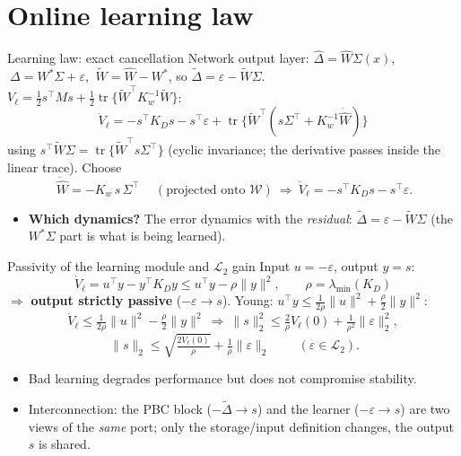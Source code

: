 \documentclass[aspectratio=169,10pt]{beamer}
\newcommand{\tr}{\operatorname{tr}}
\newcommand{\lmin}{\lambda_{\min}}
\begin{document}
\section{Online learning law}
\begin{frame}{Learning law: exact cancellation}
Network output layer: $\hat\Delta=\hat W\Sigma(x)$, $\ \Delta=W^*\Sigma+\varepsilon$, $\ \tilde W=\hat W-W^*$, so $\tilde\Delta=\varepsilon-\tilde W\Sigma$.\\[1mm]
$V_\ell=\tfrac12s^\top Ms+\tfrac12\tr\{\tilde W^\top K_w^{-1}\tilde W\}$:
\[
\dot V_\ell=-s^\top K_Ds-s^\top\varepsilon+\tr\{\tilde W^\top(s\Sigma^\top+K_w^{-1}\dot{\hat W})\}
\]
using $s^\top\tilde W\Sigma=\tr\{\tilde W^\top s\Sigma^\top\}$ (cyclic invariance; the derivative passes inside the linear trace). Choose
\[
\boxed{\ \dot{\hat W}=-K_w\,s\,\Sigma^\top\ }\quad(\text{projected onto }\mathcal W)\ \Rightarrow\ \dot V_\ell=-s^\top K_Ds-s^\top\varepsilon .
\]
\begin{itemize}
\item \textbf{Which dynamics?} The error dynamics with the \emph{residual}: $\tilde\Delta=\varepsilon-\tilde W\Sigma$ (the $W^*\Sigma$ part is what is being learned).
\end{itemize}
\end{frame}

\begin{frame}{Passivity of the learning module and $\mathcal L_2$ gain}
Input $u=-\varepsilon$, output $y=s$:
\[
\dot V_\ell=u^\top y-y^\top K_Dy\le u^\top y-\rho\|y\|^2,\qquad\rho=\lmin(K_D)
\]
$\Rightarrow$ \textbf{output strictly passive} ($-\varepsilon\to s$). Young: $u^\top y\le\frac1{2\rho}\|u\|^2+\frac\rho2\|y\|^2$:
\[
\dot V_\ell\le\tfrac1{2\rho}\|u\|^2-\tfrac\rho2\|y\|^2
\ \Rightarrow\ \|s\|_2^2\le\tfrac2\rho V_\ell(0)+\tfrac1{\rho^2}\|\varepsilon\|_2^2 ,
\]
\[
\boxed{\ \|s\|_2\le\sqrt{\tfrac{2V_\ell(0)}{\rho}}+\tfrac1\rho\|\varepsilon\|_2\ }\qquad(\varepsilon\in\mathcal L_2).
\]
\begin{itemize}
\item Bad learning degrades performance but does not compromise stability.
\item Interconnection: the PBC block ($-\tilde\Delta\to s$) and the learner ($-\varepsilon\to s$) are two views of the \emph{same} port; only the storage/input definition changes, the output $s$ is shared.
\end{itemize}
\end{frame}
\end{document}

